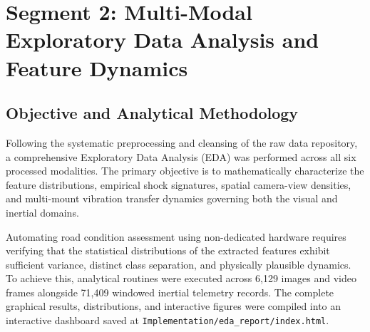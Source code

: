 
\section{Segment 2: Multi-Modal Exploratory Data Analysis and Feature Dynamics}

\subsection{Objective and Analytical Methodology}
Following the systematic preprocessing and cleansing of the raw data repository, a comprehensive Exploratory Data Analysis (EDA) was performed across all six processed modalities. The primary objective is to mathematically characterize the feature distributions, empirical shock signatures, spatial camera-view densities, and multi-mount vibration transfer dynamics governing both the visual and inertial domains. 

Automating road condition assessment using non-dedicated hardware requires verifying that the statistical distributions of the extracted features exhibit sufficient variance, distinct class separation, and physically plausible dynamics. To achieve this, analytical routines were executed across 6,129 images and video frames alongside 71,409 windowed inertial telemetry records. The complete graphical results, distributions, and interactive figures were compiled into an interactive dashboard saved at \texttt{Implementation/eda\_report/index.html}.

